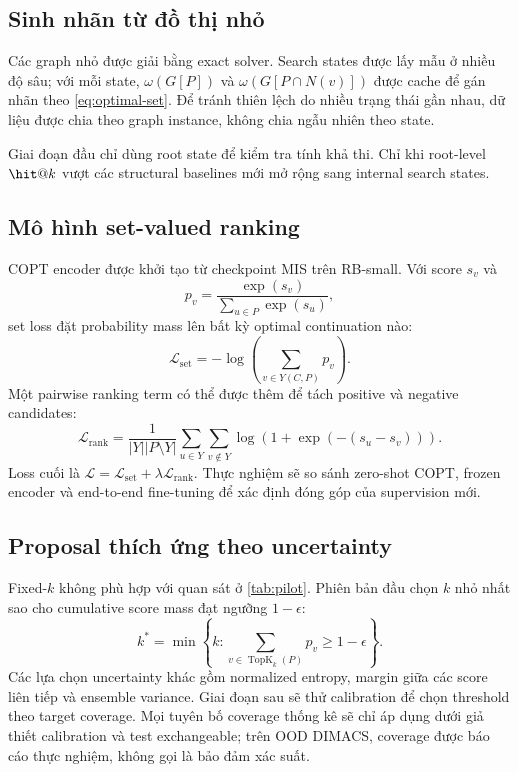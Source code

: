 \documentclass[11pt,a4paper]{article}
\newcommand{\TopK}{\operatorname{TopK}}
\begin{document}
\subsection{Sinh nhãn từ đồ thị nhỏ}

Các graph nhỏ được giải bằng exact solver. Search states được lấy mẫu ở nhiều độ sâu; với mỗi state, $\omega(G[P])$ và $\omega(G[P\cap N(v)])$ được cache để gán nhãn theo \cref{eq:optimal-set}. Để tránh thiên lệch do nhiều trạng thái gần nhau, dữ liệu được chia theo graph instance, không chia ngẫu nhiên theo state.

Giai đoạn đầu chỉ dùng root state để kiểm tra tính khả thi. Chỉ khi root-level $\hit@k$ vượt các structural baselines mới mở rộng sang internal search states.

\subsection{Mô hình set-valued ranking}

COPT encoder được khởi tạo từ checkpoint MIS trên RB-small. Với score $s_v$ và
\begin{equation}
    p_v=\frac{\exp(s_v)}{\sum_{u\in P}\exp(s_u)},
\end{equation}
set loss đặt probability mass lên bất kỳ optimal continuation nào:
\begin{equation}
    \mathcal{L}_{\mathrm{set}}
    =-\log\left(\sum_{v\in Y(C,P)}p_v\right).
\end{equation}
Một pairwise ranking term có thể được thêm để tách positive và negative candidates:
\begin{equation}
    \mathcal{L}_{\mathrm{rank}}
    =\frac{1}{|Y||P\setminus Y|}
    \sum_{u\in Y}\sum_{v\notin Y}
    \log\left(1+\exp\left(-(s_u-s_v)\right)\right).
\end{equation}
Loss cuối là $\mathcal{L}=\mathcal{L}_{\mathrm{set}}+\lambda\mathcal{L}_{\mathrm{rank}}$. Thực nghiệm sẽ so sánh zero-shot COPT, frozen encoder và end-to-end fine-tuning để xác định đóng góp của supervision mới.

\subsection{Proposal thích ứng theo uncertainty}

Fixed-$k$ không phù hợp với quan sát ở \cref{tab:pilot}. Phiên bản đầu chọn $k$ nhỏ nhất sao cho cumulative score mass đạt ngưỡng $1-\epsilon$:
\begin{equation}
    k^*=\min\left\{k:\sum_{v\in\TopK_k(P)}p_v\ge 1-\epsilon\right\}.
\end{equation}
Các lựa chọn uncertainty khác gồm normalized entropy, margin giữa các score liên tiếp và ensemble variance. Giai đoạn sau sẽ thử calibration để chọn threshold theo target coverage. Mọi tuyên bố coverage thống kê sẽ chỉ áp dụng dưới giả thiết calibration và test exchangeable; trên OOD DIMACS, coverage được báo cáo thực nghiệm, không gọi là bảo đảm xác suất.
\end{document}
